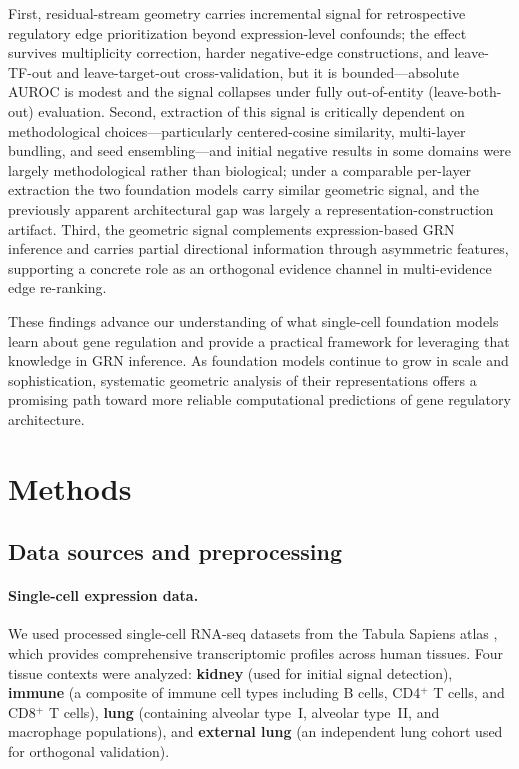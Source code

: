 \documentclass[11pt]{article}
\begin{document}
First, residual-stream geometry carries incremental signal for retrospective regulatory edge prioritization beyond expression-level confounds; the effect survives multiplicity correction, harder negative-edge constructions, and leave-TF-out and leave-target-out cross-validation, but it is bounded---absolute AUROC is modest and the signal collapses under fully out-of-entity (leave-both-out) evaluation.
Second, extraction of this signal is critically dependent on methodological choices---particularly centered-cosine similarity, multi-layer bundling, and seed ensembling---and initial negative results in some domains were largely methodological rather than biological; under a comparable per-layer extraction the two foundation models carry similar geometric signal, and the previously apparent architectural gap was largely a representation-construction artifact.
Third, the geometric signal complements expression-based GRN inference and carries partial directional information through asymmetric features, supporting a concrete role as an orthogonal evidence channel in multi-evidence edge re-ranking.

These findings advance our understanding of what single-cell foundation models learn about gene regulation and provide a practical framework for leveraging that knowledge in GRN inference.
As foundation models continue to grow in scale and sophistication, systematic geometric analysis of their representations offers a promising path toward more reliable computational predictions of gene regulatory architecture.


\section*{Methods}

\subsection*{Data sources and preprocessing}

\paragraph{Single-cell expression data.}
We used processed single-cell RNA-seq datasets from the Tabula Sapiens atlas \cite{tabulasapiens2022}, which provides comprehensive transcriptomic profiles across human tissues.
Four tissue contexts were analyzed: \textbf{kidney} (used for initial signal detection), \textbf{immune} (a composite of immune cell types including B cells, CD4$^+$ T cells, and CD8$^+$ T cells), \textbf{lung} (containing alveolar type~I, alveolar type~II, and macrophage populations), and \textbf{external lung} (an independent lung cohort used for orthogonal validation).
\end{document}
